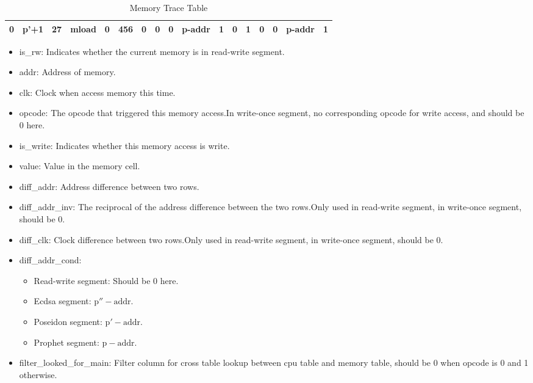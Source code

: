 \begin{table}[!ht]
\begin{adjustwidth}{-1.75cm}{}
\begin{tabular}{|c|c|c|c|c|c|c|c|c|c|c|c|c|c|c|c|c|}
            \hline
            \rowcolor{yellow!20} 0     & p'+1   & 27    & mload  & 0         & 456   & \cellcolor{lightgray} 0        & \cellcolor{lightgray} 0     & \cellcolor{lightgray} 0     & p-addr                  & \cellcolor{violet!30} 1     & 0     & \cellcolor{pink} 1     & \cellcolor{pink} 0     & \cellcolor{pink} 0     & p-addr   & 1     \\
            \hline
        \end{tabular}
        \caption{Memory Trace Table}
        \label{table:memory-trace-table}
    \end{adjustwidth}
\end{table}

\begin{itemize}
    \item is\_rw: Indicates whether the current memory is in read-write segment.
    \item addr: Address of memory.
    \item clk: Clock when access memory this time.
    \item opcode: The opcode that triggered this memory access.In write-once segment, no corresponding opcode for write access, and should be 0 here.
    \item is\_write: Indicates whether this memory access is write.
    \item value: Value in the memory cell.
    \item diff\_addr: Address difference between two rows.
    \item diff\_addr\_inv: The reciprocal of the address difference between the two rows.Only used in read-write segment, in write-once segment, should be 0.
    \item diff\_clk: Clock difference between two rows.Only used in read-write segment, in write-once segment, should be 0.
    \item diff\_addr\_cond:
          \begin{itemize}
              \item Read-write segment: Should be 0 here.
              \item Ecdsa segment: $\mathrm{p''} - \mathrm{addr}$.
              \item Poseidon segment: $\mathrm{p'} - \mathrm{addr}$.
              \item Prophet segment: $\mathrm{p} - \mathrm{addr}$.
          \end{itemize}
    \item filter\_looked\_for\_main: Filter column for cross table lookup between cpu table and memory table, should be 0 when opcode is 0 and 1 otherwise.

\end{itemize}
